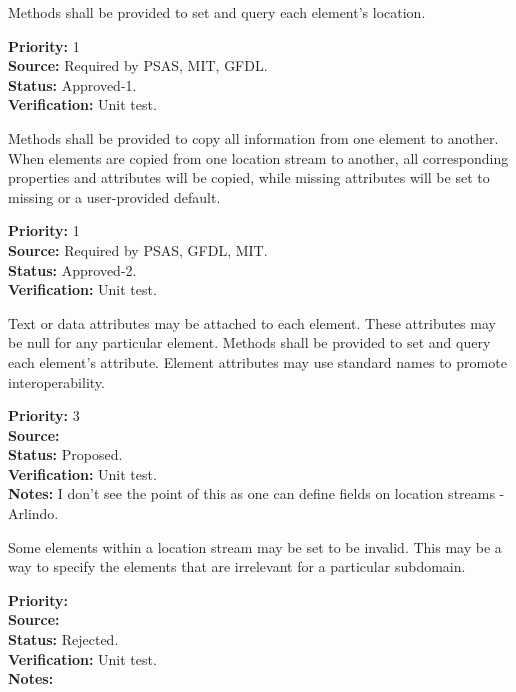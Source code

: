 Methods shall be provided to set and query each element's location.
\begin{reqlist}
{\bf Priority:} 1\\
{\bf Source:} Required by PSAS, MIT, GFDL.\\
{\bf Status:} Approved-1. \\
{\bf Verification:} Unit test.
\end{reqlist}

Methods shall be provided to copy all information from one element to another. 
When elements are copied from one location stream to another, all corresponding
properties and attributes will be copied, while missing attributes will be
set to missing or a user-provided default.
\begin{reqlist}
{\bf Priority:} 1\\
{\bf Source:} Required by PSAS, GFDL, MIT.\\
{\bf Status:} Approved-2. \\
{\bf Verification:} Unit test. 
\end{reqlist}

Text or data attributes may be attached to each element.  These
attributes may be null for any particular element.  Methods shall be provided to set
and query each element's attribute.  Element attributes may use standard names to
promote interoperability.
\begin{reqlist}
{\bf Priority:} 3\\
{\bf Source:} \\
{\bf Status:} Proposed. \\
{\bf Verification:} Unit test. \\
{\bf Notes:} I don't see the point of this as one can define fields on location streams - Arlindo.
\end{reqlist}


Some elements within a location stream may be set to be invalid.  This may be a way
to specify the elements that are irrelevant for a particular subdomain.

\begin{reqlist}
{\bf Priority:} \\
{\bf Source:} \\
{\bf Status:} Rejected. \\
{\bf Verification:} Unit test. \\
{\bf Notes:} 
\end{reqlist}

